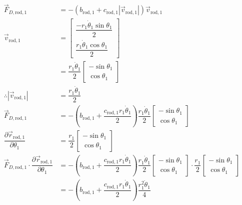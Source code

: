 \documentclass[12pt,a4paper,portrait]{article}
\begin{document}
	\begin{align*}
		\vec{F}_{D,\mathrm{rod}, 1} &= -\left(b_{\mathrm{rod}, 1} + c_{\mathrm{rod}, 1}|\vec{v}_{\mathrm{rod}, 1}|\right)\vec{v}_{\mathrm{rod}, 1} \\
		\vec{v}_{\mathrm{rod}, 1} &= \begin{bmatrix}
			\dfrac{-r_1 \dot{\theta}_1 \sin{\theta_1}}{2} \\
			\dfrac{r_1 \dot{\theta}_1 \cos{\theta_1}}{2}
		\end{bmatrix} \\
		&= \dfrac{r_1 \dot{\theta}_1}{2} \begin{bmatrix}
			-\sin{\theta_1} \\
			\cos{\theta_1}
		\end{bmatrix} \\
		\therefore |\vec{v}_{\mathrm{rod}, 1}| &= \dfrac{r_1 \dot{\theta}_1}{2} \\
		\vec{F}_{D,\mathrm{rod}, 1} &= -\left(b_{\mathrm{rod}, 1} + \dfrac{c_{\mathrm{rod}, 1}r_1 \dot{\theta}_1}{2}\right)\dfrac{r_1 \dot{\theta}_1}{2} \begin{bmatrix}
			-\sin{\theta_1} \\
			\cos{\theta_1}
		\end{bmatrix} \\
		\dfrac{\partial \vec{r}_{\mathrm{rod}, 1}}{\partial \theta_1} &= \dfrac{r_1}{2}\begin{bmatrix}
			-\sin{\theta_1} \\
			\cos{\theta_1}
		\end{bmatrix} \\
		\vec{F}_{D,\mathrm{rod}, 1} \cdot \dfrac{\partial \vec{r}_{\mathrm{rod}, 1}}{\partial \theta_1} &= -\left(b_{\mathrm{rod}, 1} + \dfrac{c_{\mathrm{rod}, 1}r_1 \dot{\theta}_1}{2}\right)\dfrac{r_1 \dot{\theta}_1}{2} \begin{bmatrix}
			-\sin{\theta_1} \\
			\cos{\theta_1}
		\end{bmatrix} \cdot \dfrac{r_1}{2}\begin{bmatrix}
			-\sin{\theta_1} \\
			\cos{\theta_1}
		\end{bmatrix} \\
		&= -\left(b_{\mathrm{rod}, 1} + \dfrac{c_{\mathrm{rod}, 1}r_1 \dot{\theta}_1}{2}\right) \dfrac{r_1^2 \dot{\theta}_1}{4} \\
	\end{align*}
\end{document}
